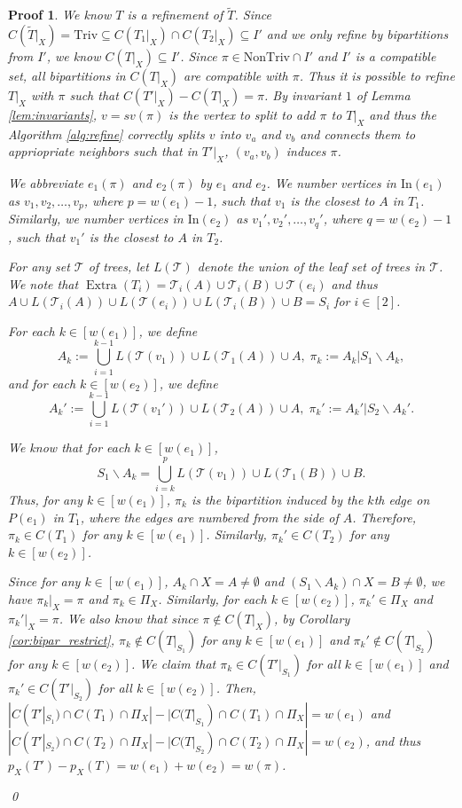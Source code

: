 \documentclass[twocolumn]{bmcart}%
\newcommand{\In}{\mathrm{In}}
\newcommand{\triv}{\mathrm{Triv}}
\newcommand{\ntriv}{\mathrm{NonTriv}}
\DeclareMathOperator*{\extra}{Extra}
\theoremstyle{mystyle}
\theoremstyle{proofstyle}
\newtheorem*{proof2}{Proof}
\newenvironment{proofnospace}{\begin{proof2}}{\qed \end{proof2}}
\begin{document}
\lemRefineAchievesWeight*
\begin{proofnospace}
    We know $T$ is a refinement of $\tilde{T}$. Since $C(\tilde{T}|_X) = \triv \subseteq C(T_1|_X) \cap C(T_2|_X) \subseteq I'$ and we only refine by bipartitions from $I'$, we know $C(T|_X) \subseteq I'$. Since $\pi \in \ntriv \cap I'$ and $I'$ is a compatible set, all bipartitions in $C(T|_X)$ are compatible with $\pi$. Thus it is possible to refine $T|_X$ with $\pi$ such that $C(T'|_X) - C(T|_X) = \pi$. By invariant $1$ of Lemma \ref{lem:invariants}, $v = sv(\pi)$ is the vertex to split to add $\pi$ to $T|_X$ and thus the Algorithm \ref{alg:refine} correctly splits $v$ into $v_a$ and $v_b$ and connects them to appriopriate neighbors such that in $T'|_X$, $(v_a,v_b)$ induces $\pi$.

    We abbreviate $e_1(\pi)$ and $e_2(\pi)$ by $e_1$ and $e_2$. We number vertices in $\In(e_1)$ as $v_1, v_2, \dots, v_p$, where $p = w(e_1)-1$, such that $v_1$ is the closest to $A$ in $T_1$. Similarly, we number vertices in $\In(e_2)$ as $v_1', v_2', \dots, v_q'$, where $q = w(e_2)-1$, such that $v_1'$ is the closest to $A$ in $T_2$.

    For any set $\mathcal{T}$ of trees, let $L(\mathcal{T})$ denote the union of the leaf set of trees in $\mathcal{T}$. We note that $\extra(T_i) = \mathcal{T}_i(A) \cup \mathcal{T}_i(B) \cup \mathcal{T}(e_i)$ and thus $A \cup L(\mathcal{T}_i(A)) \cup L(\mathcal{T}(e_i)) \cup L(\mathcal{T}_i(B)) \cup B = S_i$ for $i \in [2]$. 
    
    For each $k \in [w(e_1)]$, we define
    \[A_k := \bigcup_{i = 1}^{k-1} L(\mathcal{T}(v_1)) \cup L(\mathcal{T}_1(A)) \cup A,\; \pi_k := A_k | S_1 \backslash A_k,\] 
    and for each $k \in [w(e_2)]$, we define
    \[A_k' := \bigcup_{i = 1}^{k-1} L(\mathcal{T}(v_1')) \cup L(\mathcal{T}_2(A)) \cup A,\; \pi_k' := A_k' | S_2 \backslash A_k'.\]
    
    We know that for each $k \in [w(e_1)]$, \[S_1 \backslash A_k = \bigcup_{i = k}^{p} L(\mathcal{T}(v_1)) \cup L(\mathcal{T}_1(B)) \cup B.\] 
    Thus, for any $k \in [w(e_1)]$, $\pi_k$ is the bipartition induced by the $k$th edge on $P(e_1)$ in $T_1$, where the edges are numbered from the side of $A$. Therefore, $\pi_k \in C(T_1)$ for any $k \in [w(e_1)]$. Similarly, $\pi_k' \in C(T_2)$  for any $k \in [w(e_2)]$. 

    Since for any $k \in [w(e_1)]$, $A_k \cap X = A \neq \emptyset$ and $(S_1 \backslash A_k) \cap X = B \neq \emptyset$, we have $\pi_k |_X = \pi$ and $\pi_k \in \Pi_X$. Similarly, for each $k \in [w(e_2)]$, $\pi_k' \in \Pi_X$ and $\pi_k'|_X = \pi$. We also know that since $\pi \notin C(T|_X)$, by Corollary \ref{cor:bipar_restrict}, $\pi_k \notin C(T|_{S_1})$ for any $k \in [w(e_1)]$ and $\pi_k' \notin C(T|_{S_2})$ for any $k \in [w(e_2)]$. We claim that $\pi_k \in C(T'|_{S_1})$ for all $k \in [w(e_1)]$ and $\pi_k' \in C(T'|_{S_2})$ for all $k \in [w(e_2)]$. Then, $|C(T'|_{S_1})\cap C(T_1) \cap \Pi_X| - |C(T|_{S_1})\cap C(T_1) \cap \Pi_X| = w(e_1)$ and $|C(T'|_{S_2}) \cap C(T_2) \cap \Pi_X| - |C(T|_{S_2}) \cap C(T_2) \cap \Pi_X| = w(e_2)$, and thus $p_X(T') - p_X(T) = w(e_1) + w(e_2) = w(\pi)$. 
    

\end{proofnospace}
\end{document}
